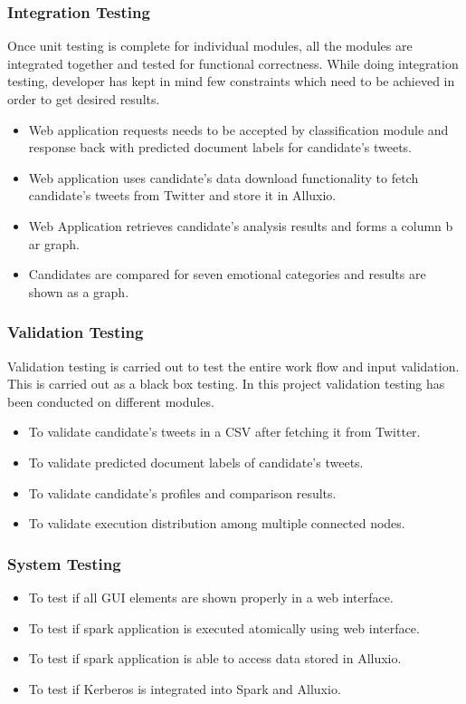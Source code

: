 \documentclass[oneside,a4paper,12pt]{pictreport}
\begin{document}
\subsubsection{Integration Testing}
Once unit testing is complete for individual modules, all the modules are integrated together and tested for functional correctness. While doing integration testing, developer has kept in mind few constraints which need to be achieved in order to get desired results.
\begin{itemize}
\item Web application requests needs to be accepted by classification module and response back with predicted document labels for candidate's tweets.
\item Web application uses candidate's data download functionality to fetch candidate's tweets from Twitter and store it in Alluxio.
\item Web Application retrieves candidate's analysis results and forms a column b ar graph.
\item Candidates are compared for seven emotional categories and results are shown as a graph.
\end{itemize}

\subsubsection{Validation Testing}
Validation testing is carried out to test the entire work flow and input validation. This is carried out as a black box testing. In this project validation testing has been conducted on different modules.
\begin{itemize}
\item To validate candidate's tweets in a CSV after fetching it from Twitter.
\item To validate predicted document labels of candidate's tweets.
\item To validate candidate's profiles and comparison results.
\item To validate execution distribution among multiple connected nodes.
\end{itemize}

\subsubsection{System Testing}
\begin{itemize}
\item To test if all GUI elements are shown properly in a web interface.
\item To test if spark application is executed atomically using web interface.
\item To test if spark application is able to access data stored in Alluxio.
\item To test if Kerberos is integrated into Spark and Alluxio.
\end{itemize}
\end{document}

